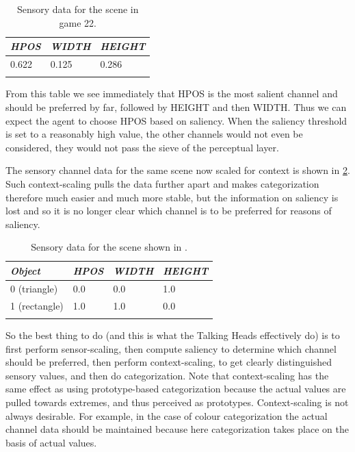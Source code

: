 \begin{table}
\begin{center}
\begin{tabular}{ l  l  l }
\lsptoprule
{\itshape HPOS} & {\itshape WIDTH} & {\itshape HEIGHT} \\ \midrule
 0.622 & 0.125 & 0.286  \\ 
\lspbottomrule
\end{tabular}
\caption{\label{tab:t-game22-sal} Sensory data for the scene in game 22.}
\end{center}
\end{table}
From this table we see immediately that HPOS is the 
most salient channel and should be preferred by far, followed
by HEIGHT and then WIDTH. Thus we can expect the
agent to choose HPOS based on saliency. When the saliency threshold
is set to a reasonably high value, the other channels
would not even be considered, they would not pass the 
sieve of the perceptual layer. 

The sensory channel data for the 
same scene now scaled for context is shown in \ref{tab:t-game22scaled}. Such context-scaling 
pulls the data further apart and makes categorization 
therefore much easier and much more 
stable, but the information on saliency is lost and so 
it is no longer clear which channel is to be preferred
for reasons of saliency. 

\begin{table}
\begin{center}
\begin{tabular}{ l  l  l  l }
\lsptoprule
{\itshape Object} & {\itshape HPOS} & {\itshape WIDTH} & {\itshape HEIGHT} \\ \midrule
0 (triangle) & 0.0 & 0.0 & 1.0  \\ 
1 (rectangle) & 1.0 & 1.0 & 0.0 \\  
\lspbottomrule
\end{tabular}
\caption{\label{tab:t-game22scaled} Sensory data for the scene shown in .}
\end{center}
\end{table}
So the best thing to do (and this is what the Talking Heads 
effectively do) is to first perform sensor-scaling, then 
compute saliency to determine which channel should be 
preferred, then perform context-scaling, to get clearly 
distinguished sensory values, and then do categorization. 
Note that context-scaling has the same effect as using 
prototype-based categorization because the actual values 
are pulled towards extremes, and thus perceived as 
prototypes. Context-scaling is not always desirable. For example, 
in the case of colour categorization the actual channel
data should be maintained because here categorization 
takes place on the basis of actual values. 

